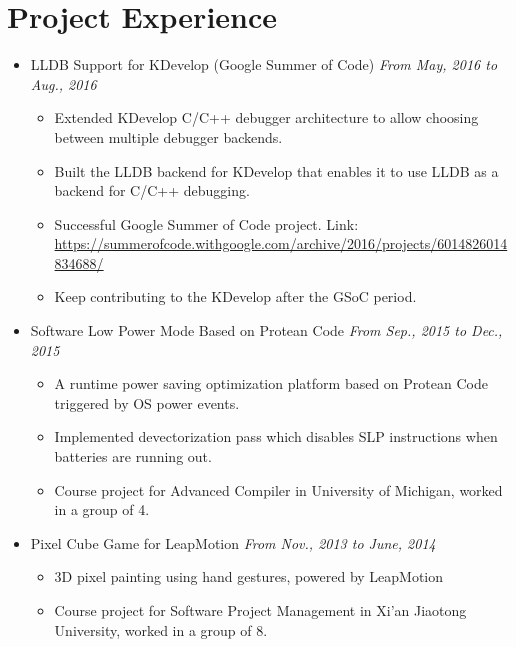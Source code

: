 \documentclass[a4paper,11pt]{article}
\begin{document}
\section{Project Experience}

\begin{itemize}
    \item LLDB Support for KDevelop (Google Summer of Code) \hfill \textit{From May, 2016 to Aug., 2016}
    \begin{itemize}
        \item Extended KDevelop C/C++ debugger architecture to allow choosing between multiple debugger 
backends.
        \item Built the LLDB backend for KDevelop that enables it to use LLDB as a backend for C/C++ 
debugging.
\item Successful Google Summer of Code project. Link:
\url{https://summerofcode.withgoogle.com/archive/2016/projects/6014826014834688/}
        \item Keep contributing to the KDevelop after the GSoC period.
    \end{itemize}

    \item Software Low Power Mode Based on Protean Code \hfill \textit{From Sep., 2015 to Dec., 2015}
    \begin{itemize}
        \item A runtime power saving optimization platform based on Protean Code triggered by OS power events.
        \item Implemented devectorization pass which disables SLP instructions when batteries are running out.
        \item Course project for Advanced Compiler in University of Michigan, worked in a group of 4.
    \end{itemize}

    \item Pixel Cube Game for LeapMotion \hfill \textit{From Nov., 2013 to June, 2014}
    \begin{itemize}
        \item 3D pixel painting using hand gestures, powered by LeapMotion
        \item Course project for Software Project Management in Xi'an Jiaotong University, worked in a group
of 8.
    \end{itemize}
\end{itemize}

\end{document}

